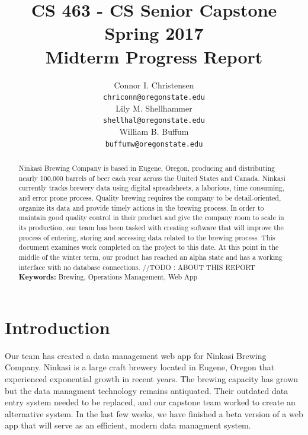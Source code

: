 \documentclass[draftclsnofoot,onecolumn,letterpaper,10pt,compsoc]{IEEEtran}
\title{CS 463 - CS Senior Capstone
	\\Spring 2017
	\\Midterm Progress Report
}
\author{
	Connor I. Christensen \\
	\texttt{chriconn@oregonstate.edu}
	\\
	Lily M. Shellhammer \\
	\texttt{shellhal@oregonstate.edu}
	\\
	William B. Buffum \\
	\texttt{buffumw@oregonstate.edu}
}
\begin{document}
\begin{titlingpage}
    \maketitle
    \begin{abstract}
			Ninkasi Brewing Company is based in Eugene, Oregon, producing and distributing nearly 100,000 barrels of beer each year across the United States and Canada.
			Ninkasi currently tracks brewery data using digital spreadsheets, a laborious, time consuming, and error prone process.
			Quality brewing requires the company to be detail-oriented, organize its data and provide timely actions in the brewing process.
			In order to maintain good quality control in their product and give the company room to scale in its production, our team has been tasked with creating software that will improve the process of entering, storing and accessing data related to the brewing process.
			This document examines work completed on the project to this date.
			At this point in the middle of the winter term, our product has reached an alpha state and has a working interface with no database connections.
			//TODO : ABOUT THIS REPORT
			\\
			\textbf{Keywords:} Brewing, Operations Management, Web App
    \end{abstract}
		\pagebreak
		\tableofcontents
\end{titlingpage}


\section{Introduction}
Our team has created a data management web app for Ninkasi Brewing Company.
Ninkasi is a large craft brewery located in Eugene, Oregon that experienced exponential growth in recent years.
The brewing capacity has grown but the data managment technology remains antiquated.
Their outdated data entry system needed to be replaced, and our capstone team worked to create an alternative system.
In the last few weeks, we have finished a beta version of a web app that will serve as an efficient, modern data managment system.
\end{document}
